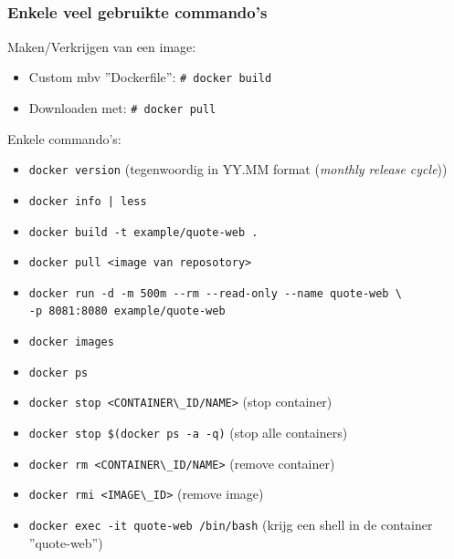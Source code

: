 \subsection{}
\begin{styleframefrag}
	\frametitle{Enkele veel gebruikte commando's}
Maken/Verkrijgen van een image:
\pause
\begin{itemize}
	\item Custom mbv ''Dockerfile'': \verb!# docker build!
	\pause
	\item Downloaden met: \verb!# docker pull!
	\pause
\end{itemize}
Enkele commando's:
\tiny
\begin{itemize}
	\item \verb!docker version! (tegenwoordig in YY.MM format ({\it monthly release cycle}))
	\pause
	\item \verb!docker info | less!
	\pause
	\item \verb!docker build -t example/quote-web .!
	\pause
	\item \verb!docker pull <image van reposotory>!
	\pause
	\item \verb!docker run -d -m 500m --rm --read-only --name quote-web \!
		  \verb!           -p 8081:8080 example/quote-web!
	\pause
	\item \verb!docker images!
	\pause
	\item \verb!docker ps!
	\pause
	\item \verb!docker stop <CONTAINER\_ID/NAME>! (stop container)
	\pause
	\item \verb!docker stop $(docker ps -a -q)! (stop alle containers)
	\pause
	\item \verb!docker rm <CONTAINER\_ID/NAME>! (remove container)
	\pause
	\item \verb!docker rmi <IMAGE\_ID>!  (remove image)
	\pause
	\item \verb!docker exec -it quote-web /bin/bash! (krijg een shell in de container ''quote-web'')
	\pause
\end{itemize}
\end{styleframefrag}

